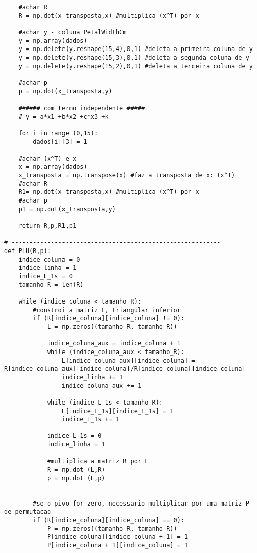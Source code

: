 \documentclass[a4paper,12pt,twoside]{article}
\begin{document}
\begin{lstlisting}
    #achar R
    R = np.dot(x_transposta,x) #multiplica (x^T) por x
    
    #achar y - coluna PetalWidthCm
    y = np.array(dados) 
    y = np.delete(y.reshape(15,4),0,1) #deleta a primeira coluna de y
    y = np.delete(y.reshape(15,3),0,1) #deleta a segunda coluna de y
    y = np.delete(y.reshape(15,2),0,1) #deleta a terceira coluna de y
    
    #achar p 
    p = np.dot(x_transposta,y) 
  
    ###### com termo independente #####
    # y = a*x1 +b*x2 +c*x3 +k
     
    for i in range (0,15):
        dados[i][3] = 1
        
    #achar (x^T) e x
    x = np.array(dados) 
    x_transposta = np.transpose(x) #faz a transposta de x: (x^T)
    #achar R
    R1= np.dot(x_transposta,x) #multiplica (x^T) por x
    #achar p 
    p1 = np.dot(x_transposta,y) 
      
    return R,p,R1,p1

# ----------------------------------------------------------
def PLU(R,p):
    indice_coluna = 0 
    indice_linha = 1
    indice_L_1s = 0
    tamanho_R = len(R)
    
    while (indice_coluna < tamanho_R):
        #constroi a matriz L, triangular inferior
        if (R[indice_coluna][indice_coluna] != 0):
            L = np.zeros((tamanho_R, tamanho_R))
            
            indice_coluna_aux = indice_coluna + 1
            while (indice_coluna_aux < tamanho_R):
                L[indice_coluna_aux][indice_coluna] = - R[indice_coluna_aux][indice_coluna]/R[indice_coluna][indice_coluna]
                indice_linha += 1
                indice_coluna_aux += 1
            
            while (indice_L_1s < tamanho_R):
                L[indice_L_1s][indice_L_1s] = 1
                indice_L_1s += 1
            
            indice_L_1s = 0
            indice_linha = 1
                 
            #multiplica a matriz R por L
            R = np.dot (L,R)
            p = np.dot (L,p)
        
                
        #se o pivo for zero, necessario multiplicar por uma matriz P de permutacao
        if (R[indice_coluna][indice_coluna] == 0):
            P = np.zeros((tamanho_R, tamanho_R))
            P[indice_coluna][indice_coluna + 1] = 1
            P[indice_coluna + 1][indice_coluna] = 1
            

\end{lstlisting}
\end{document}
